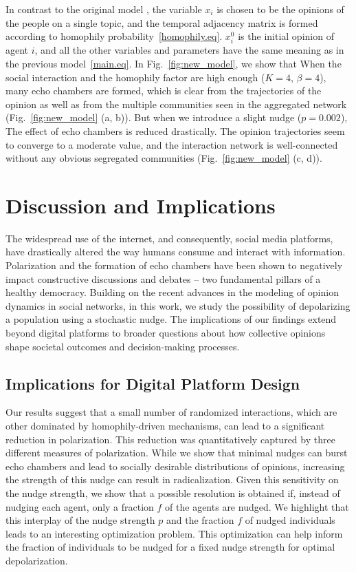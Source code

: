 In contrast to the original model \cite{modeling-explosive-opinion-depolarization-in-interdependent-topics}, the variable $x_i$ is chosen to be the opinions of the people on a single topic, and the temporal adjacency matrix is formed according to homophily probability~\eqref{homophily.eq}. $x_i^0$ is the initial opinion of agent $i$, and all the other variables and parameters have the same meaning as in the previous model~\eqref{main.eq}. In Fig.~\ref{fig:new_model}, we show that When the social interaction and the homophily factor are high enough ($K = 4$, $\beta = 4$), many echo chambers are formed, which is clear from the trajectories of the opinion as well as from the multiple communities seen in the aggregated network (Fig.~\ref{fig:new_model} (a, b)). But when we introduce a slight nudge ($p = 0.002$), The effect of echo chambers is reduced drastically. The opinion trajectories seem to converge to a moderate value, and the interaction network is well-connected without any obvious segregated communities (Fig.~\ref{fig:new_model} (c, d)).

\section{Discussion and Implications}

The widespread use of the internet, and consequently, social media platforms, have drastically altered the way humans consume and interact with information. Polarization and the formation of echo chambers have been shown to negatively impact constructive discussions and debates -- two fundamental pillars of a healthy democracy. Building on the recent advances in the modeling of opinion dynamics in social networks, in this work, we study the possibility of depolarizing a population using a stochastic nudge. The implications of our findings extend beyond digital platforms to broader questions about how collective opinions shape societal outcomes and decision-making processes.

\subsection{Implications for Digital Platform Design}

Our results suggest that a small number of randomized interactions, which are other dominated by homophily-driven mechanisms, can lead to a significant reduction in polarization. This reduction was quantitatively captured by three different measures of polarization. While we show that minimal nudges can burst echo chambers and lead to socially desirable distributions of opinions, increasing the strength of this nudge can result in radicalization. Given this sensitivity on the nudge strength, we show that a possible resolution is obtained if, instead of nudging each agent, only a fraction $f$ of the agents are nudged. We highlight that this interplay of the nudge strength $p$ and the fraction $f$ of nudged individuals leads to an interesting optimization problem. This optimization can help inform the fraction of individuals to be nudged for a fixed nudge strength for optimal depolarization.

